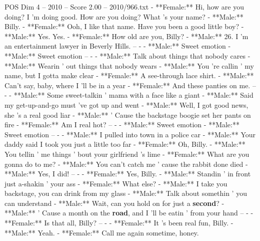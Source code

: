 \begin{textsample}{POS Dim 4 – 2010 – Score 2.00 – 2010/966.txt}  \label{ex:f4_pos_036}
- **Female:** Hi, how are you doing?
I 'm doing good.
How are you doing?
What 's your name? - **Male:** Billy. - **Female:** Ooh, I like that name.
Have you been a good little boy? - **Male:** Yes.
Yes. - **Female:** How old are you, Billy? - **Male:** 26.
I 'm an entertainment lawyer in Beverly Hills. -- - - **Male:** Sweet emotion - **Male:** Sweet emotion -- - - **Male:** Talk about things that nobody cares - **Male:** Wearin ' out things that nobody wears - **Male:** You 're callin ' my name, but I gotta make clear - **Female:** A see-through lace shirt. - **Male:** Can't say, baby, where I 'll be in a year - **Female:** And these panties on me. -- - - **Male:** Some sweet-talkin ' mama with a face like a giant - **Male:** Said my get-up-and-go must 've got up and went - **Male:** Well, I got good news, she 's a real good liar - **Male:** ' Cause the backstage boogie set her pants on fire - **Female:** Am I real hot? -- - - **Male:** Sweet emotion - **Male:** Sweet emotion -- - - **Male:** I pulled into town in a police car - **Male:** Your daddy said I took you just a little too far - **Female:** Oh, Billy. - **Male:** You tellin ' me things ' bout your girlfriend 's lime - **Female:** What are you gonna do to me? - **Male:** You can't catch me ' cause the rabbit done died - **Male:** Yes, I did! -- - - **Female:** Yes, Billy. - **Male:** Standin ' in front just a-shakin ' your ass - **Female:** What else? - **Male:** I take you backstage, you can drink from my glass - **Male:** Talk about somethin ' you can understand - **Male:** Wait, can you hold on for just a \textbf{second}? - **Male:** ' Cause a month on the \textbf{road}, and I 'll be eatin ' from your hand -- - - **Female:** Is that all, Billy? -- - - **Female:** It 's been real fun, Billy. - **Male:** Yeah. - **Female:** Call me again sometime, honey.

\end{textsample}
